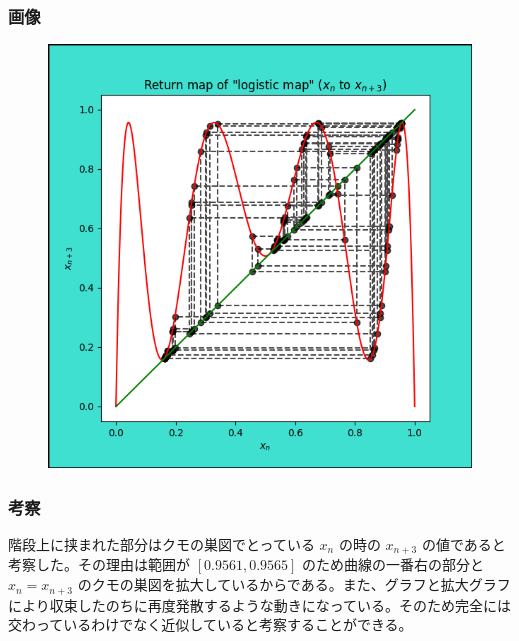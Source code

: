 \subsubsection{画像}
\begin{figure}[htbp]
  \centering
  \includegraphics[keepaspectratio, scale=0.5]{images/Problem7/tast7_3.png}
\end{figure}

\subsubsection{考察}
階段上に挟まれた部分はクモの巣図でとっている $x_n$ の時の $x_{n+3}$ の値であると考察した。その理由は範囲が $[0.9561, 0.9565]$ のため曲線の一番右の部分と $x_n = x_{n+3}$ のクモの巣図を拡大しているからである。また、グラフと拡大グラフにより収束したのちに再度発散するような動きになっている。そのため完全には交わっているわけでなく近似していると考察することができる。


